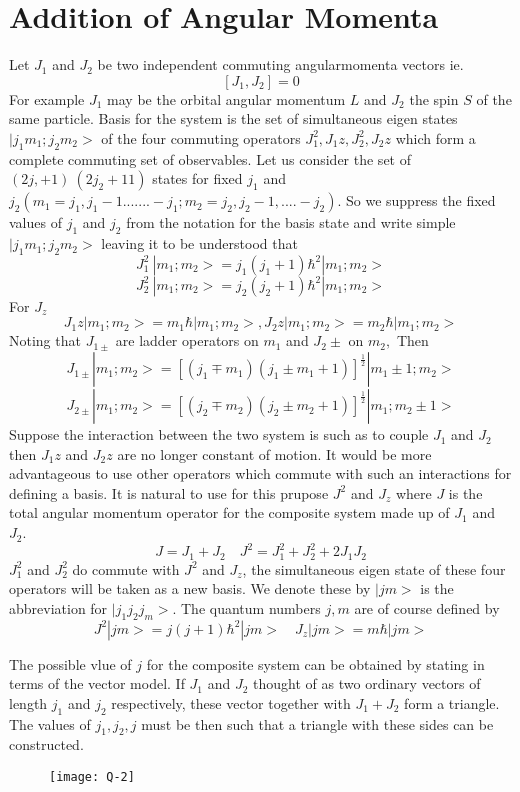 \section{Addition of Angular Momenta}
Let $J_1$ and $J_2$ be two independent commuting angularmomenta vectors ie.
$$[J_1,J_2]=0$$
For example $J_1$ may be the orbital angular momentum $L$ and $J_2$ the spin $S$ of the same particle. Basis for the system is the set of simultaneous eigen states $|j_1 m_1;j_2 m_2>$ of the four commuting operators $J_1^2,J_1z,J_2^2,J_2z$ which form a complete commuting set of observables. Let us consider the set of $(2j,+1)\  (2j_2+11)$ states for fixed $j_1$ and $j_2(m_1=j_1, j_1 -1.......-j_1;m_2=j_2, j_2-1,....-j_2)$. So we suppress the fixed values of $j_1$ and $j_2$ from the notation for the basis state and write simple $|j_1 m_1 ; j_2 m_2>$ leaving it to be understood that
$$ J_1^2\ |m_1;m_2>=j_1 (j_1+1)\hbar^2 |m_1 ; m_2>$$
$$ J_2^2\ |m_1;m_2>=j_2 (j_2+1)\hbar^2 |m_1 ; m_2>$$
For $J_z$\\
$$J_1z|m_1;m_2>=m_1\hbar|m_1;m_2>,J_2z|m_1;m_2>=m_2\hbar|m_1;m_2>$$
Noting that $J_{1\pm}$ are ladder operators on $m_1$ and $J_2\pm$ on $m_2,$ Then
$$J_{1\pm}|m_1;m_2>=[(j_1\mp m_1)(j_1\pm m_1+1)]^\frac{1}{2}|m_1\pm 1;m_2>$$
$$J_{2\pm}|m_1;m_2>=[(j_2\mp m_2)(j_2\pm m_2+1)]^\frac{1}{2}|m_1;m_2\pm 1>$$
Suppose the interaction between the two system is such as to couple $J_1$ and $J_2$ then $J_1z$ and $J_2z$ are no longer constant of motion. It would be more advantageous to use other operators which commute with such an interactions for defining a basis. It is natural to use for this prupose $J^2$ and $J_z$ where $J$ is the total angular momentum operator for the composite system made up of $J_1$ and $J_2$.
$$ J=J_1+J_2\quad J^2=J_1^2+J_2^2+2J_1J_2$$
$J_1^2$ and $J_2^2$ do commute with $J^2$ and $J_z$, the simultaneous eigen state of these four operators will be taken as a new basis. We denote these by $|jm>$ is the abbreviation for $|j_1j_2j_m>$. The quantum numbers $j,m$ are of course defined by
$$ J^2|jm>=j(j+1)\hbar^2|jm>\quad J_z|jm>=m\hbar|jm>$$
\par The possible vlue of $j$ for the composite system can be obtained by stating in terms of the vector model. If $J_1$ and $J_2$ thought of as two ordinary vectors of length $j_1$ and $j_2$ respectively, these vector together with $J_1+J_2$ form a triangle. The values of $j_1, j_2, j$ must be then such that a triangle with these sides can be constructed.
\begin{figure}[H]
	\centering
	\texttt{[image: Q-2]}
\end{figure}
